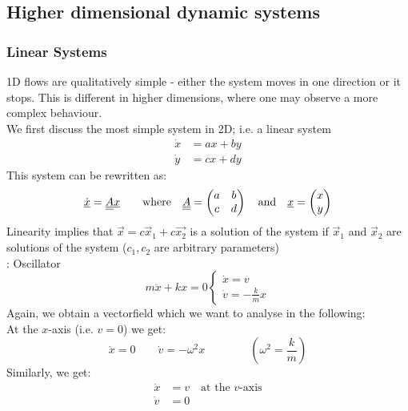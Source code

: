 \subsection{Higher dimensional dynamic systems}
\subsubsection{Linear Systems}
1D flows are qualitatively simple - either the system moves in one direction or it stops. This is different in higher dimensions, where one may observe a more complex behaviour.\\
We first discuss the most simple system in 2D; i.e. a linear system
\begin{align*}
	\dot{x}&=ax+by\\
	\dot{y}&=cx+dy
\end{align*}
This system can be rewritten as:
\begin{equation*}
	\dot{\underline{\smash{x}}}=\underline{\underline{A}}\underline{\smash{x}}\qquad\text{where}\quad\underline{\underline{A}}=\begin{pmatrix} a & b \\ c & d \end{pmatrix}\quad\text{and}\quad\underline{\smash{x}}=\begin{pmatrix}x\\ y\end{pmatrix}
\end{equation*}
Linearity implies that $\vec{x}=c\vec{x}_1+c\vec{x_2}$ is a solution of the system if $\vec{x}_1$ and $\vec{x}_2$ are solutions of the system ($c_1,c_2$ are arbitrary parameters)\vspace{0.5 cm}\\
\textbf{\underline{}}: Oscillator
\begin{equation*}
	m\ddot{x}+kx=0\begin{cases}\dot{x}=v\\\dot{v}=-\frac{k}{m}x\end{cases}
\end{equation*}
Again, we obtain a vectorfield which we want to analyse in the following:\\
At the $x$-axis (i.e. $v=0$) we get:
\begin{equation*}
	\dot{x}=0\qquad \dot{v}=-\omega^2 x\qquad\qquad \left(\omega^2=\frac{k}{m}\right)
\end{equation*}
Similarly, we get:
\begin{align*}
	\dot{x}&=v \quad\text{at the $v$-axis}\\
	\dot{v}&=0
\end{align*}
